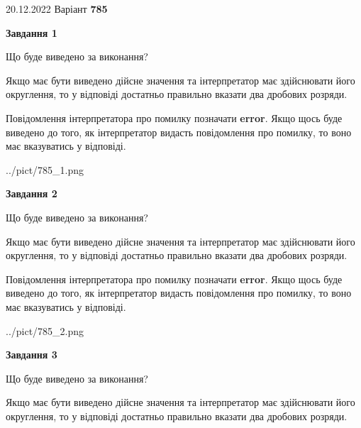 \documentclass[12pt, ukrainian]{article}
\begin{document}
{20.12.2022 Варіант \No \textbf { 785 }\par}
{
\begin {Large}

{\begin {center}\textbf{Завдання 1}\end {center}}\par
Що буде виведено за виконання? \par

Якщо має бути виведено дійсне значення та інтерпретатор має здійснювати його округлення, 
то у відповіді достатньо правильно вказати два дробових розряди.

Повідомлення інтерпретатора про помилку позначати \textbf{error}.
Якщо щось буде виведено до того, як інтерпретатор видасть повідомлення про помилку, 
то воно має вказуватись у відповіді. \par

\begin{center}
	{../pict/785_1.png}
\end{center}
\newpage

{\begin {center}\textbf{Завдання 2}\end {center}}\par
Що буде виведено за виконання? \par

Якщо має бути виведено дійсне значення та інтерпретатор має здійснювати його округлення, 
то у відповіді достатньо правильно вказати два дробових розряди.

Повідомлення інтерпретатора про помилку позначати \textbf{error}.
Якщо щось буде виведено до того, як інтерпретатор видасть повідомлення про помилку, 
то воно має вказуватись у відповіді. \par

\begin{center}
	{../pict/785_2.png}
\end{center}
\newpage

{\begin {center}\textbf{Завдання 3}\end {center}}\par
Що буде виведено за виконання? \par

Якщо має бути виведено дійсне значення та інтерпретатор має здійснювати його округлення, 
то у відповіді достатньо правильно вказати два дробових розряди.


\end{Large}}
\end{document}
